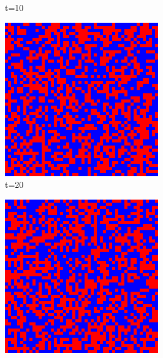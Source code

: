 \documentclass[a4paper, 11pt]{article}
\begin{document}
\begin{figure}[H]
\begin{subfigure}{.25\textwidth}
  \caption{t=10}
\end{subfigure}
\begin{subfigure}{.25\textwidth}
  \centering
  \includegraphics[width=0.9\linewidth]{SNOWDRIFT_MOORE_50x50_t20}
  \caption{t=20}
\end{subfigure}%
\begin{subfigure}{.25\textwidth}
  \centering
  \includegraphics[width=0.9\linewidth]{SNOWDRIFT_MOORE_50x50_t50}

\end{subfigure}
\end{figure}
\end{document}
